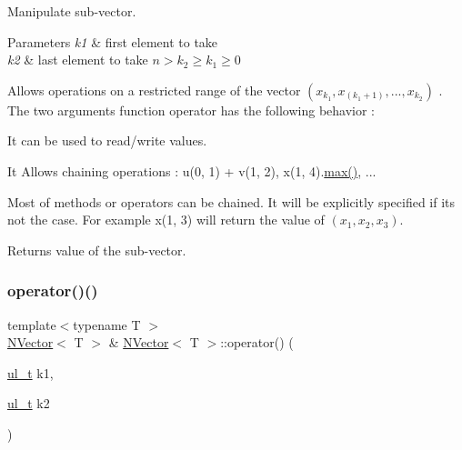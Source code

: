 Manipulate sub-\/vector. 


\begin{DoxyParams}{Parameters}
{\em k1} & first element to take \\
\hline
{\em k2} & last element to take $ n \gt k_2 \geq k_1 \geq 0 $\\
\hline
\end{DoxyParams}
Allows operations on a restricted range of the vector $ (x_{k_1}, x_{(k_1+1)}, ...,x_{k_2}) $ . The two arguments function operator has the following behavior \+:
\begin{DoxyItemize}
\item It can be used to read/write values.
\item It Allows chaining operations \+: {\ttfamily u(0, 1) + v(1, 2)}, {\ttfamily x(1, 4).\mbox{\hyperlink{class_n_vector_afc7553743872ccb71e902a154eb60dc2}{max()}}}, ...
\end{DoxyItemize}

Most of methods or operators can be chained. It will be explicitly specified if it\textquotesingle{}s not the case. For example {\ttfamily x(1, 3)} will return the value of $ (x_1, x_2, x_3) $.

\begin{DoxyReturn}{Returns}
value of the sub-\/vector. 
\end{DoxyReturn}
\mbox{\label{class_n_vector_a98f95a46c34ceaf355e86e9dad9863e1}} 
\subsubsection{\texorpdfstring{operator()()}{operator()()}\hspace{0.1cm}{\footnotesize\ttfamily [4/4]}}
{\footnotesize\ttfamily template$<$typename T $>$ \\
\mbox{\hyperlink{class_n_vector}{N\+Vector}}$<$ T $>$ \& \mbox{\hyperlink{class_n_vector}{N\+Vector}}$<$ T $>$\+::operator() (\begin{DoxyParamCaption}\item[{\mbox{\hyperlink{typedef_8h_a1b140a2034db3f5dfe18a987745df43a}{ul\+\_\+t}}}]{k1,  }\item[{\mbox{\hyperlink{typedef_8h_a1b140a2034db3f5dfe18a987745df43a}{ul\+\_\+t}}}]{k2 }\end{DoxyParamCaption})}



